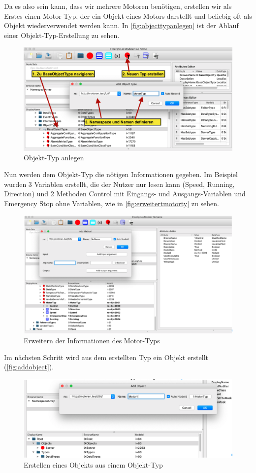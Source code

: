 Da es also sein kann, dass wir mehrere Motoren benötigen, erstellen wir als Erstes einen Motor-Typ, der ein Objekt eines Motors darstellt und beliebig oft als Objekt wiederverwendet werden kann. In \autoref{fig:objecttypanlegen} ist der Ablauf einer Objekt-Typ-Erstellung zu sehen.
\begin{figure}[H]
	\centering
	\includegraphics[width=1\linewidth]{abb/ObjectTypAnlegen}
	\caption{Objekt-Typ anlegen}
	\label{fig:objecttypanlegen}
\end{figure}
Nun werden dem Objekt-Typ die nötigen Informationen gegeben.
Im Beispiel wurden 3 Variablen erstellt, die der Nutzer nur lesen kann (Speed, Running, Direction) und 2 Methoden Control mit Eingangs- und Ausgangs-Variablen und Emergency Stop ohne Variablen, wie in \autoref{fig:erweitertmotorty} zu sehen.
\begin{figure}[H]
	\centering
	\includegraphics[width=1\linewidth]{abb/ERweitertMotorTy}
	\caption{Erweitern der Informationen des Motor-Typs}
	\label{fig:erweitertmotorty}
\end{figure}
Im nächsten Schritt wird aus dem erstellten Typ ein Objekt erstellt (\autoref{fig:addobject}).
\begin{figure}[H]
	\centering
	\includegraphics[width=1\linewidth]{abb/AddObject}
	\caption{Erstellen eines Objekts aus einem Objekt-Typ}
	\label{fig:addobject}
\end{figure}
